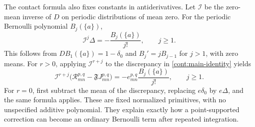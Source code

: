 The contact formula also fixes constants in antiderivatives.
Let $\mathcal I$ be the zero-mean inverse of $D$ on periodic
distributions of mean zero.  For the periodic Bernoulli polynomial
$B_j(\{a\})$,
\begin{equation}\label{cont:Bernoulli-inverse}
 \mathcal I^j\Delta=-\frac{B_j(\{a\})}{j!},\qquad j\ge1.
\end{equation}
This follows from $DB_1(\{a\})=1-\delta_0$ and
$B_j'=jB_{j-1}$ for $j>1$, with zero means.
For $r>0$, applying $\mathcal I^{r+j}$ to the discrepancy in
\eqref{cont:main-identity} yields
\begin{equation}\label{cont:contact-primitive}
 \mathcal I^{r+j}\bigl(\mathcal R_{mn}^{p,q}
             -\mathfrak FJ_{mn}^{p,q}\bigr)
       =-e_{mn}^{p,q}\frac{B_j(\{a\})}{j!},\qquad j\ge1.
\end{equation}
For $r=0$, first subtract the mean of the discrepancy, replacing
$e\delta_0$ by $e\Delta$, and the same formula applies.
These are fixed normalized primitives, with no unspecified additive
polynomial.  They explain exactly how a point-supported correction
can become an ordinary Bernoulli term after repeated integration.
